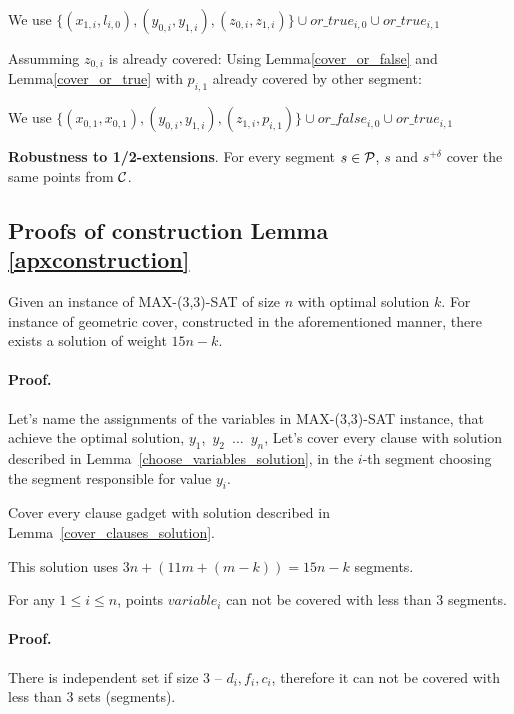 We use 
$\{ (x_{1, i}, l_{i, 0}), (y_{0, i}, y_{1, i}),
(z_{0, i}, z_{1, i}) \} \cup or\_true_{i, 0} \cup or\_true_{i, 1}$

Assumming $z_{0, i}$ is already covered:
Using Lemma\ref{cover_or_false} and Lemma\ref{cover_or_true} with $p_{i, 1}$ already covered by other segment:

We use 
$\{ (x_{0, 1}, x_{0, 1}), (y_{0, i}, y_{1, i}),
(z_{1, i}, p_{i, 1}) \} \cup or\_false_{i, 0} \cup or\_true_{i, 1}$


\begin{lemma}
\textbf{Robustness to 1/2-extensions}. For every segment $s \in \mathcal{P}$,
$s$ and $s^{+\delta}$ cover the same points from $\mathcal{C}$.
\end{lemma}

\subsection{Proofs of construction Lemma \ref{apxconstruction}}
\begin{lemma}
	\label{construction_correctness}
	Given an instance of MAX-(3,3)-SAT of size $n$
	with optimal solution $k$.
	For instance of geometric cover, constructed
	in the aforementioned manner, 
	there exists a solution of weight $15n - k$.
\end{lemma}
\paragraph{Proof.}
Let's name the assignments of the variables in MAX-(3,3)-SAT instance,
that achieve the optimal solution,
$y_1$,~$y_2$~$\ldots$~$y_n$,
Let's cover every clause with solution described in
Lemma~\ref{choose_variables_solution},
in the $i$-th segment choosing the segment responsible for value $y_i$.

Cover every clause gadget with solution described in
Lemma~\ref{cover_clauses_solution}.

This solution uses $3n + (11m + (m-k)) = 15n - k$ segments.


\begin{lemma}
\label{choose_variables_no_less}
For any $1 \le i \le n$, points $variable_i$
can not be covered with less than 3 segments.
\end{lemma}

\paragraph{Proof.}
There is independent set if size 3 -- $d_i, f_i, c_i$, therefore it can
not be covered with less than 3 sets (segments).


